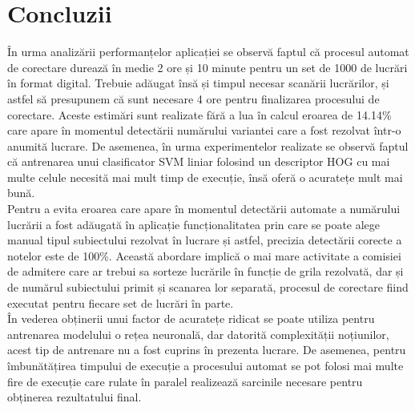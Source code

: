 \documentclass[a4paper,12pt]{report}
\newcommand\tab[1][1cm]{\hspace*{#1}}
\begin{document}
\chapter{Concluzii}
\tab În urma analizării performanțelor aplicației se observă faptul că procesul automat de corectare durează în medie 2 ore și 10 minute pentru un set de 1000 de lucrări în format digital. Trebuie adăugat însă și timpul necesar scanării lucrărilor, și astfel să presupunem că sunt necesare 4 ore pentru finalizarea procesului de corectare. Aceste estimări sunt realizate fără a lua în calcul eroarea de 14.14\% care apare în momentul detectării numărului variantei care a fost rezolvat într-o anumită lucrare. De asemenea, în urma experimentelor realizate se observă faptul că antrenarea unui clasificator SVM liniar folosind un descriptor HOG cu mai multe celule necesită mai mult timp de execuție, însă oferă o acuratețe mult mai bună. 
\\ \tab Pentru a evita eroarea care apare în momentul detectării automate a numărului lucrării a fost adăugată în aplicație funcționalitatea prin care se poate alege manual tipul subiectului rezolvat în lucrare și astfel, precizia detectării corecte a notelor este de 100\%. Această abordare implică o mai mare activitate a comisiei de admitere care ar trebui sa sorteze lucrările în funcție de grila rezolvată, dar și de numărul subiectului primit și scanarea lor separată, procesul de corectare fiind executat pentru fiecare set de lucrări în parte.
\\ \tab În vederea obținerii unui factor de acuratețe ridicat se poate utiliza pentru antrenarea modelului o rețea neuronală, dar datorită complexității noțiunilor, acest tip de antrenare nu a fost cuprins în prezenta lucrare. De asemenea, pentru îmbunătățirea timpului de execuție a procesului automat se pot folosi mai multe fire de execuție care rulate în paralel realizează sarcinile necesare pentru obținerea rezultatului final.


\chapter*{}
\end{document}
